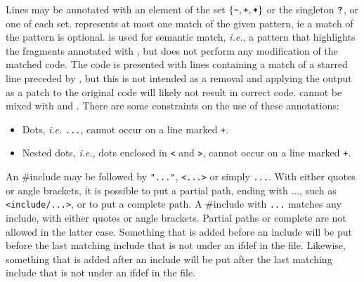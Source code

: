 \begin{grammar}
  \CASE{}


\end{grammar}

\noindent
Lines may be annotated with an element of the set $\{\mbox{\tt{{-}}}, \mbox{\tt{{+}}},
\mbox{\tt{{*}}}\}$ or the singleton $\mbox{\tt{{?}}}$, or one of each set. 
represents at most one match of the given pattern, ie a match of the
pattern is optional. \mtt{*} is used for
semantic match, \emph{i.e.}, a pattern that highlights the fragments
annotated with \mtt{*}, but does not perform any modification of the
matched code. The code is presented with lines containing a match of a
starred line preceded
by \mtt{-}, but this is not intended as a removal and applying the output
as a patch to the original code will likely not result in correct code.
\mtt{*} cannot be mixed with \mtt{-} and \mtt{+}.  There are
some constraints on the use of these annotations:
\begin{itemize}
\item Dots, {\em i.e.} \texttt{...}, cannot occur on a line marked
  \texttt{+}.
\item Nested dots, {\em i.e.}, dots enclosed in {\tt <} and {\tt >}, cannot
  occur on a line marked \texttt{+}.
\end{itemize}

An \#include may be followed by \texttt{"..."}, \texttt{<...>} or simply
\texttt{...}.  With either quotes or angle brackets, it is possible to put
a partial path, ending with ..., such as \texttt{<include/...>}, or to put a
complete path.  A \#include with \texttt{...} matches any include, with
either quotes or angle brackets.  Partial paths or complete are not allowed
in the latter case.  Something that is added before an include will be put
before the last matching include that is not under an ifdef in the file.
Likewise, something that is added after an include will be put after the
last matching include that is not under an ifdef in the file.

